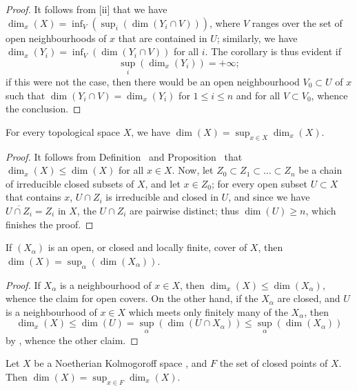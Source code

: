 \begin{proof}
\label{proof-0.14.1.5}
It follows from [ii] that we have $\dim_x(X) = \inf_V(\sup_i(\dim(Y_i\cap V)))$, where $V$ ranges over the set of open neighbourhoods of $x$ that are contained in $U$;
similarly, we have $\dim_x(Y_i) = \inf_V(\dim(Y_i\cap V))$ for all $i$.
The corollary is thus evident if
\[
    \sup_i(\dim_x(Y_i)) = +\infty;
\]
if this were not the case, then there would be an open neighbourhood $V_0\subset U$ of $x$ such that $\dim(Y_i\cap V)=\dim_x(Y_i)$ for $1\leq i\leq n$ and for all $V\subset V_0$, whence the conclusion.
\end{proof}

\begin{prop}[14.1.6]
\label{0.14.1.6}
For every topological space $X$, we have $\dim(X)=\sup_{x\in X}\dim_x(X)$.
\end{prop}

\begin{proof}
\label{proof-0.14.1.6}
It follows from Definition~ and Proposition~ that $\dim_x(X)\leq\dim(X)$ for all $x\in X$.
Now, let $Z_0\subset Z_1\subset\ldots\subset Z_n$ be a chain of irreducible closed subsets of $X$, and let $x\in Z_0$;
for every open subset $U\subset X$ that contains $x$, $U\cap Z_i$ is irreducible  and closed in $U$, and since we have $\overline{U\cap Z_i}=Z_i$ in $X$, the $U\cap Z_i$ are pairwise distinct;
thus $\dim(U)\geq n$, which finishes the proof.
\end{proof}

\begin{cor}[14.1.7]
\label{0.14.1.7}
If $(X_\alpha)$ is an open, or closed and locally finite, cover of $X$, then $\dim(X)=\sup_\alpha(\dim(X_\alpha))$.
\end{cor}

\begin{proof}
\label{proof-0.14.1.7}
If $X_\alpha$ is a neighbourhood of $x\in X$, then $\dim_x(X)\leq\dim(X_\alpha)$, whence the claim for open covers.
On the other hand, if the $X_\alpha$ are closed, and $U$ is a neighbourhood of $x\in X$ which meets only finitely many of the $X_\alpha$, then
\[
    \dim_x(X)\leq\dim(U)=\sup_\alpha(\dim(U\cap X_\alpha))\leq\sup_\alpha(\dim(X_\alpha))
\]
by , whence the other claim.
\end{proof}

\begin{cor}[14.1.8]
\label{0.14.1.8}
Let $X$ be a Noetherian Kolmogoroff space , and $F$ the set of closed points of $X$.
Then $\dim(X)=\sup_{x\in F}\dim_x(X)$.
\end{cor}

